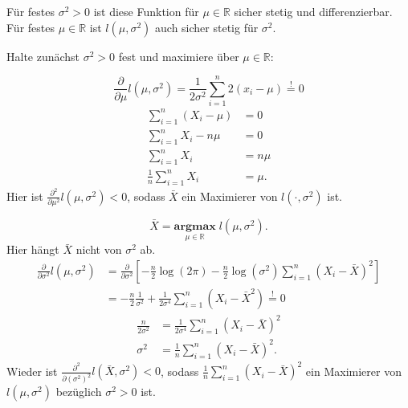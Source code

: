 \documentclass[10pt]{article}
\newcommand{\IR}{\mathbb{R}} %
\newenvironment{BSP}[1][]
{\begin{Beispiel}[frametitle=#1]}{\end{Beispiel}}
\begin{document}
\begin{BSP}[Beispiel 1.3.8 (Maximum-Likelihood)]
\begin{enumerate}[label = (\roman*)]
			Für festes $\sigma^2 >0$ ist diese Funktion für $\mu \in \IR$ sicher stetig und differenzierbar. Für festes $\mu \in \IR$ ist $l(\mu, \sigma^2)$ auch sicher stetig für $\sigma^2$. 
			
			Halte zunächst $\sigma^2 >0$ fest und maximiere über $\mu \in \IR$: 
			
			\begin{equation*}
				\frac{\partial}{\partial \mu} l(\mu, \sigma^2) = \frac{1}{2\sigma^2} \sum_{i=1}^{n}2(x_i-\mu) \overset{!}= 0
			\end{equation*}
			\begin{equation*}
				\begin{split}
					\sum_{i=1}^{n}(X_i - \mu) &= 0\\
					\sum_{i=1}^{n}X_i - n\mu &= 0\\
					\sum_{i=1}^{n}X_i &= n\mu \\
					\frac{1}{n}\sum_{i=1}^{n}X_i &= \mu.			
				\end{split}
			\end{equation*}
			Hier ist $\frac{\partial^2}{\partial\mu^2}l(\mu, \sigma^2) <0$, sodass $\bar{X}$ ein Maximierer von $l(\cdot,\sigma^2)$ ist. 
			
			\begin{equation*}
				\bar{X} = \underset{\mu \in \IR}{\textbf{argmax}}\; l(\mu, \sigma^2).
			\end{equation*}
			Hier hängt $\bar{X}$ nicht von $\sigma^2$ ab. 
			\begin{equation*}
				\begin{split}
				\frac{\partial}{\partial \sigma^2} l (\mu, \sigma^2) &= \frac{\partial}{\partial \sigma^2} \left[-\frac{n}{2}\log(2\pi)-\frac{n}{2}\log(\sigma^2)\sum_{i=1}^{n}(X_i - \bar{X})^2\right]\\ &= -\frac{n}{2} \frac{1}{\sigma^2}+ \frac{1}{2\sigma^4}\sum_{i=1}^{n}(X_i-\bar{X}^2) \overset{!} = 0
			\end{split}
			\end{equation*}
			\begin{equation*}
				\begin{split}
					\frac{n}{2\sigma^2} &= \frac{1}{2\sigma^4}\sum_{i=1}^{n}(X_i - \bar{X})^2\\
					\sigma^2 &= \frac{1}{n}\sum_{i=1}^{n}(X_i-\bar{X})^2.
				\end{split}
			\end{equation*}
			Wieder ist  $\frac{\partial^2}{\partial (\sigma^2)^2} l(\bar{X}, \sigma^2)<0$, sodass $\frac{1}{n}$$\sum_{i=1}^{n}(X_i-\bar{X})^2$ ein Maximierer von $l(\mu, \sigma^2)$ bezüglich $\sigma^2 > 0$ ist. 
			

\end{enumerate}
\end{BSP}
\end{document}
